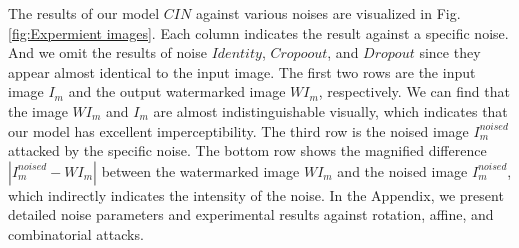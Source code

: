 \documentclass[sigconf]{acmart}
\begin{document}
The results of our model $CIN$ against various noises are visualized in Fig. \ref{fig:Expermient images}. Each column indicates the result against a specific noise. And we omit the results of noise $Identity$, $Cropoout$, and $Dropout$ since they appear almost identical to the input image. 
The first two rows are the input image $I_{m}$ and the output watermarked image $WI_{m}$, respectively. We can find that the image $WI_{m}$ and $I_{m}$ are almost indistinguishable visually, which indicates that our model has excellent imperceptibility. The third row is the noised image $I_{m}^{noised}$ attacked by the specific noise. The bottom row shows the magnified difference $|I_{m}^{noised}-WI_{m}|$ between the watermarked image $WI_{m}$ and the noised image $I_{m}^{noised}$, which indirectly indicates the intensity of the noise. In the Appendix, we present detailed noise parameters and experimental results against rotation, affine, and combinatorial attacks.
\end{document}
